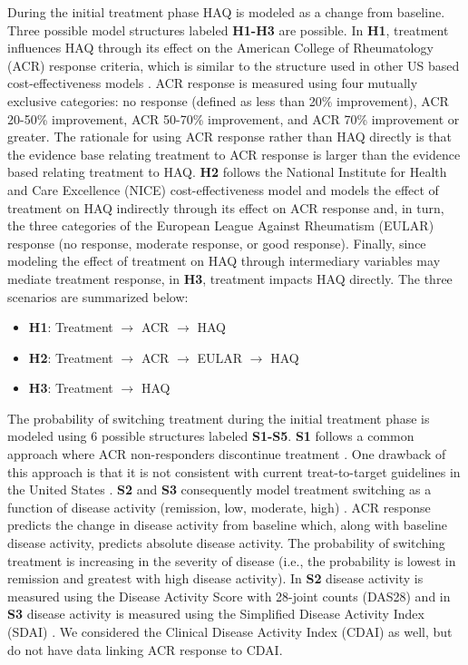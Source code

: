 \documentclass[11pt,final,fleqn]{article}\usepackage[]{graphicx}\usepackage[]{color}
\theoremstyle{plain}
\begin{document}
During the initial treatment phase HAQ is modeled as a change from baseline. Three possible model structures labeled \textbf{H1-H3} are possible. In \textbf{H1}, treatment influences HAQ through its effect on the American College of Rheumatology (ACR) response criteria, which is similar to the structure used in other US based cost-effectiveness models \citep[e.g.][]{carlson2015economic, icer2017tim}. ACR response is measured using four mutually exclusive categories: no response (defined as less than 20\% improvement), ACR 20-50\% improvement, ACR 50-70\% improvement, and ACR 70\% improvement or greater. The rationale for using ACR response rather than HAQ directly is that the evidence base relating treatment to ACR response is larger than the evidence based relating treatment to HAQ. \textbf{H2} follows the National Institute for Health and Care Excellence (NICE) cost-effectiveness model \citep{stevenson2016adalimumab, stevenson2017cost} and models the effect of treatment on HAQ indirectly through its effect on ACR response and, in turn, the three categories of the European League Against Rheumatism (EULAR) response (no response, moderate response, or good response). Finally, since modeling the effect of treatment on HAQ through intermediary variables may mediate treatment response, in \textbf{H3}, treatment impacts HAQ directly. The three scenarios are summarized below: 

\begin{itemize}
\item \textbf{H1}: Treatment $\rightarrow$ ACR $\rightarrow$ HAQ
\item \textbf{H2}: Treatment $\rightarrow$ ACR $\rightarrow$ EULAR $\rightarrow$ HAQ
\item \textbf{H3}: Treatment $\rightarrow$ HAQ
\end{itemize}

The probability of switching treatment during the initial treatment phase is modeled using 6 possible structures labeled \textbf{S1-S5}. \textbf{S1} follows a common approach where ACR non-responders discontinue treatment \citep[e.g.][]{carlson2015economic, icer2017tim}. One drawback of this approach is that it is not consistent with current treat-to-target guidelines in the United States \citep{singh20162015}. \textbf{S2} and \textbf{S3} consequently model treatment switching as a function of disease activity (remission, low, moderate, high) \citep{anderson2012rheumatoid}. ACR response predicts the change in disease activity from baseline which, along with baseline disease activity, predicts absolute disease activity. The probability of switching treatment is increasing in the severity of disease (i.e., the probability is lowest in remission and greatest with high disease activity). In \textbf{S2} disease activity is measured using the Disease Activity Score with 28-joint counts (DAS28) \citep{prevoo1995modified} and in \textbf{S3} disease activity is measured using the Simplified Disease Activity Index (SDAI) \citep{smolen2003simplified, aletaha2005simplified}. We considered the Clinical Disease Activity Index (CDAI) as well, but do not have data linking ACR response to CDAI.
\end{document}
